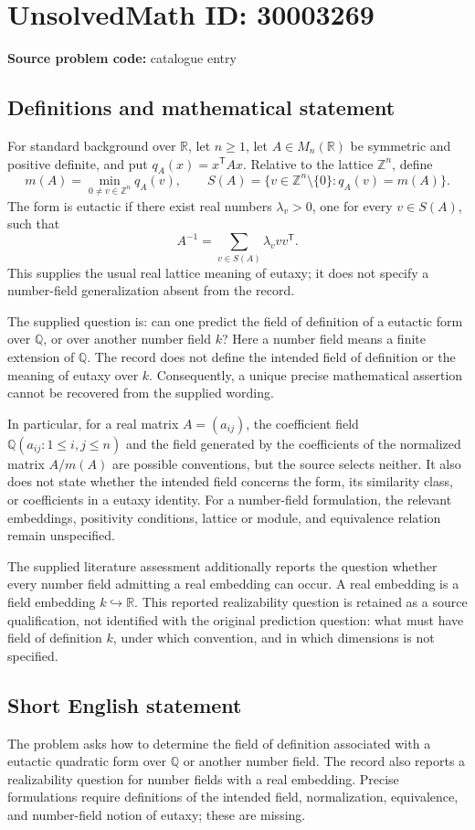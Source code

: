\documentclass[11pt]{article}
\newcommand{\Z}{\mathbb{Z}}
\newcommand{\Q}{\mathbb{Q}}
\newcommand{\R}{\mathbb{R}}
\begin{document}
\section*{UnsolvedMath ID: 30003269}
\textbf{Source problem code:} catalogue entry
\subsection{Definitions and mathematical statement}
For standard background over \(\R\), let \(n\geq 1\), let \(A\in M_n(\R)\) be symmetric and positive definite, and put \(q_A(x)=x^{\mathsf T}Ax\). Relative to the lattice \(\Z^n\), define
\[
m(A)=\min_{0\ne v\in\Z^n}q_A(v),\qquad
S(A)=\{v\in\Z^n\setminus\{0\}:q_A(v)=m(A)\}.
\]
The form is eutactic if there exist real numbers \(\lambda_v>0\), one for every \(v\in S(A)\), such that
\[
A^{-1}=\sum_{v\in S(A)}\lambda_v vv^{\mathsf T}.
\]
This supplies the usual real lattice meaning of eutaxy; it does not specify a number-field generalization absent from the record.

The supplied question is: can one predict the field of definition of a eutactic form over \(\Q\), or over another number field \(k\)? Here a number field means a finite extension of \(\Q\). The record does not define the intended field of definition or the meaning of eutaxy over \(k\). Consequently, a unique precise mathematical assertion cannot be recovered from the supplied wording.

In particular, for a real matrix \(A=(a_{ij})\), the coefficient field \(\Q(a_{ij}:1\leq i,j\leq n)\) and the field generated by the coefficients of the normalized matrix \(A/m(A)\) are possible conventions, but the source selects neither. It also does not state whether the intended field concerns the form, its similarity class, or coefficients in a eutaxy identity. For a number-field formulation, the relevant embeddings, positivity conditions, lattice or module, and equivalence relation remain unspecified.

The supplied literature assessment additionally reports the question whether every number field admitting a real embedding can occur. A real embedding is a field embedding \(k\hookrightarrow\R\). This reported realizability question is retained as a source qualification, not identified with the original prediction question: what must have field of definition \(k\), under which convention, and in which dimensions is not specified.
\subsection{Short English statement}
The problem asks how to determine the field of definition associated with a eutactic quadratic form over \(\Q\) or another number field. The record also reports a realizability question for number fields with a real embedding. Precise formulations require definitions of the intended field, normalization, equivalence, and number-field notion of eutaxy; these are missing.
\end{document}
